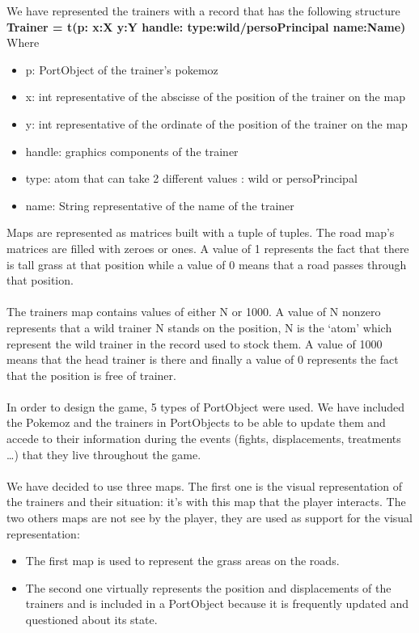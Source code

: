 \documentclass[a4paper,10pt]{article}
\begin{document}
We have represented the trainers with a record that has the following structure \\
\textbf{Trainer = t(p: x:X y:Y handle: type:wild/persoPrincipal name:Name)}\\
Where 
\begin{itemize}
\item   	p: PortObject of the trainer’s pokemoz
\item x: int representative of the abscisse of the position of the trainer on the map 
\item y: int representative of the ordinate of the position of the trainer on the map 
\item handle: graphics components of the trainer 
\item type: atom that can take 2 different values : wild or persoPrincipal
\item name: String representative of the name of the trainer \\
\end{itemize}


Maps are represented as matrices built with a tuple of tuples. The road map’s matrices are filled with zeroes or ones. A value of 1 represents the fact that there is tall grass at that position while a value of 0 means that a road passes through that position.

\paragraph{}
The trainers map contains values of either N or 1000. A value of  N nonzero  represents that a wild trainer N stands on the position, N is the ‘atom’ which represent the wild trainer in the record used to stock them. A value of 1000 means that the head trainer is there and finally a value of 0 represents the fact that the position is free of trainer.

\paragraph{}
In order to design the game, 5 types of PortObject were used. We have included the Pokemoz and the trainers in PortObjects to be able to update them and accede to their information during the events (fights, displacements, treatments …) that they live throughout the game.  

\paragraph{}
We have decided to use three maps. 
The first one is the visual representation of the trainers and their situation: it’s with this map that the player interacts. 
The two others maps are not see by the player, they are used as support for the visual representation: 
\begin{itemize}
\item The first map is used to represent the grass areas on the roads. 
\item The second one virtually represents the position and displacements of the trainers and is included in a PortObject because it is frequently updated and questioned about its state. 
\end{itemize}
\end{document}
